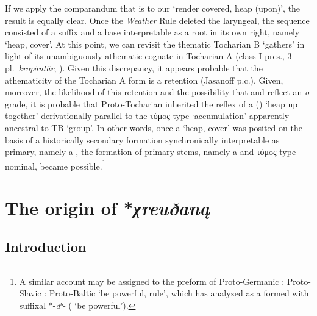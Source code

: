 \documentclass[output=paper,colorlinks,citecolor=brown]{langscibook}
\begin{document}
If we apply the comparandum that is  to our  ‘render covered, heap (upon)’, the result is equally clear. Once the \textit{Weather} Rule deleted the laryngeal, the sequence consisted of a suffix  and a base  interpretable as a root in its own right, namely  ‘heap, cover’. At this point, we can revisit the thematic Tocharian B  ‘gathers’ in light of its unambiguously athematic cognate  in Tocharian A (class I pres., 3 pl.\ \mbox{\textit{kropäntär},} \citealt[614--616]{Malzahn2010}). Given this discrepancy, it appears probable that the athematicity of the Tocharian A form is a retention (Jasanoff p.c.). Given, moreover, the likelihood of this retention and the possibility that  and  reflect an \textit{o}-grade, it is probable that Proto-Tocharian inherited the reflex of a  (\citealt[70--79]{Jasanoff2003})  ‘heap up together’ derivationally parallel to the τόμoς-type  ‘accumulation’ apparently ancestral to TB  ‘group’. In other words, once a  ‘heap, cover’ was posited on the basis of a historically secondary formation  synchronically interpretable as primary, namely a , the formation of primary stems,  namely a  and τόμoς-type nominal, became possible.\footnote{A similar account may be assigned to the preform of Proto-Germanic  : Proto-Slavic  : Proto-Baltic  ‘be powerful, rule’, which \citet[129--135]{RothsteinDowden2022} has analyzed as a  formed with suffixal *-\textit{dʰ-} ( ‘be powerful’).}

\section{The origin of *\textit{χreuðaną}}
\subsection{Introduction}
\end{document}

